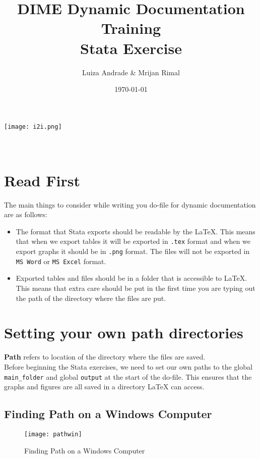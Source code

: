 \documentclass[]{article}
\title{DIME Dynamic Documentation Training \\ Stata Exercise}
\author{Luiza Andrade \& Mrijan Rimal}
\date{\today}
\begin{document}
\makeatletter
\begin{titlepage}
	\begin{center}
		\texttt{[image: i2i.png]}\\[10ex]
		{\LARGE \bfseries  \@title }\\[2ex] 
		{\Large  \@author}\\[20ex] 
		{\large \@date}
	\end{center}
\end{titlepage}
\makeatother
\section*{Read First}
The main things to consider while writing you do-file for dynamic documentation are as follows: 

\begin{itemize}
	\item The format that Stata exports should be readable by the {\LaTeX}. This means that when we export tables it will be exported in \texttt{.tex} format and when we export graphs it should be in \texttt{.png} format. 
		\subitem The files will not be exported in \texttt{MS Word} or \texttt{MS Excel} format.
	
	\item Exported tables and files should be in a folder that is accessible to {\LaTeX}. This means that extra care should be put in the first time you are typing out the path of the directory where the files are put. 
 \end{itemize}
\section*{Setting your own path directories}

\textbf{Path} refers to location of the directory where the files are saved. \\

Before beginning the Stata exercises, we need to set our own paths to the global \texttt{main\_folder} and global \texttt{output} at the start of the do-file. This ensures that the graphs and figures are all saved in a directory {\LaTeX} can access. 

\subsection*{Finding Path on a Windows Computer}
\begin{figure}[H]
	\centering
	\texttt{[image: pathwin]}
	\caption{Finding Path on a Windows Computer}
	\label{fig:pathwin}
\end{figure}
\end{document}
